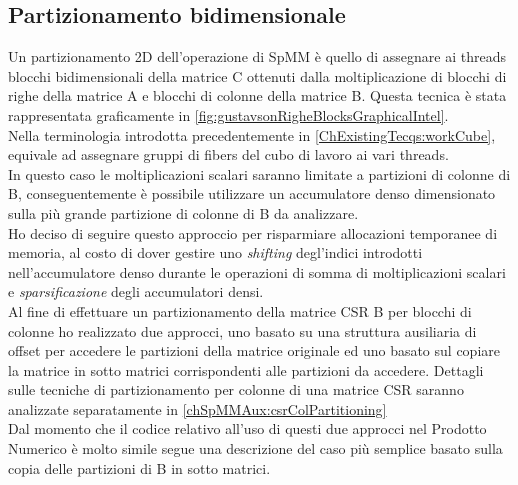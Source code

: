 \subsection{Partizionamento bidimensionale} \label{chSpMMNum:parti2D}
Un partizionamento 2D dell'operazione di SpMM è quello di assegnare ai threads 
blocchi bidimensionali della matrice C ottenuti dalla moltiplicazione di
blocchi di righe della matrice A e blocchi di colonne della matrice B.
Questa tecnica è stata rappresentata graficamente in \ref{fig:gustavsonRigheBlocksGraphicalIntel}.\\
Nella terminologia introdotta precedentemente in \ref{ChExistingTecqs:workCube}, equivale ad
assegnare gruppi di fibers del cubo di lavoro ai vari threads.\\
In questo caso le moltiplicazioni scalari saranno limitate a partizioni di colonne di B,
conseguentemente è possibile utilizzare un accumulatore denso dimensionato sulla più grande
partizione di colonne di B da analizzare.\\
Ho deciso di seguire questo approccio per risparmiare allocazioni temporanee di memoria, 
al costo di dover gestire uno \emph{shifting} degl'indici introdotti nell'accumulatore denso
durante le operazioni di
somma di moltiplicazioni scalari e \emph{sparsificazione} degli accumulatori densi.\\
\label{chSpMMNum:csrColPartitioning}
Al fine di effettuare un partizionamento della matrice CSR B per blocchi di colonne 
ho realizzato due approcci, uno basato su una struttura ausiliaria di offset per accedere le partizioni della matrice originale
ed uno basato sul copiare la matrice in sotto matrici corrispondenti alle partizioni da accedere.
Dettagli sulle tecniche di partizionamento per colonne di una matrice CSR saranno analizzate
separatamente in \ref{chSpMMAux:csrColPartitioning}\\
Dal momento che il codice relativo all'uso di questi due approcci nel Prodotto Numerico è molto simile
segue una descrizione del caso più semplice basato sulla copia delle partizioni di B in sotto matrici.\\

